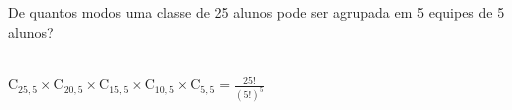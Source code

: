 \begin{ex}
 De quantos modos uma classe de 25 alunos pode ser agrupada em 5 equipes de 5 alunos?
 \begin{sol}
     \phantom{A} \\
 $\mathrm{C}_{{25},5} \times\mathrm{C}_{{20},5} \times \mathrm{C}_{{15},5} \times \mathrm{C}_{{10},5} \times \mathrm{C}_{5,5}= \frac{25!}{(5!)^5}$
 \end{sol}
\end{ex}